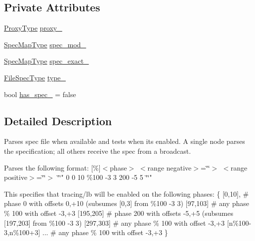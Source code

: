 \subsection*{Private Attributes}
\begin{DoxyCompactItemize}
\item 
\hyperlink{structvt_1_1utils_1_1file__spec_1_1_file_spec_ac4ad61ed146069ab671ec1bf909ebded}{Proxy\+Type} \hyperlink{structvt_1_1utils_1_1file__spec_1_1_file_spec_ad320eea42e6243424117a513217d2706}{proxy\+\_\+}
\item 
\hyperlink{structvt_1_1utils_1_1file__spec_1_1_file_spec_a368a4ab8bf689e0b533abac71ae9393b}{Spec\+Map\+Type} \hyperlink{structvt_1_1utils_1_1file__spec_1_1_file_spec_abfe003275eb54e3406a1334e46c15eea}{spec\+\_\+mod\+\_\+}
\item 
\hyperlink{structvt_1_1utils_1_1file__spec_1_1_file_spec_a368a4ab8bf689e0b533abac71ae9393b}{Spec\+Map\+Type} \hyperlink{structvt_1_1utils_1_1file__spec_1_1_file_spec_a4a5c0c4c23187242eedc7d60142adea4}{spec\+\_\+exact\+\_\+}
\item 
\hyperlink{namespacevt_1_1utils_1_1file__spec_adc8912eb2949ca15d0f29afc0342f71e}{File\+Spec\+Type} \hyperlink{structvt_1_1utils_1_1file__spec_1_1_file_spec_aa3e8f2e2f3d7cb7b33bdbbab31331cba}{type\+\_\+}
\item 
bool \hyperlink{structvt_1_1utils_1_1file__spec_1_1_file_spec_a8a9add55a41950f8e283b7ea667ad782}{has\+\_\+spec\+\_\+} = false
\end{DoxyCompactItemize}


\subsection{Detailed Description}
Parses spec file when available and tests when its enabled. A single node parses the specification; all others receive the spec from a broadcast. 

Parses the following format\+: \mbox{[}\%\mbox{]}$<$phase$>$ $<$range negative$>$=\char`\"{}\char`\"{}$>$ $<$range positive$>$=\char`\"{}\char`\"{}$>$ \char`\"{}\char`\"{}" 0 0 10 \%100 -\/3 3 200 -\/5 5 \char`\"{}\char`\"{}"

This specifies that tracing/lb will be enabled on the following phases\+: \{ \mbox{[}0,10\mbox{]}, \# phase 0 with offsets 0,+10 (subsumes \mbox{[}0,3\mbox{]} from \%100 -\/3 3) \mbox{[}97,103\mbox{]} \# any phase \% 100 with offset -\/3,+3 \mbox{[}195,205\mbox{]} \# phase 200 with offsets -\/5,+5 (subsumes \mbox{[}197,203\mbox{]} from \%100 -\/3 3) \mbox{[}297,303\mbox{]} \# any phase \% 100 with offset -\/3,+3 \mbox{[}n\%100-\/3,n\%100+3\mbox{]} ... \# any phase \% 100 with offset -\/3,+3 \}

